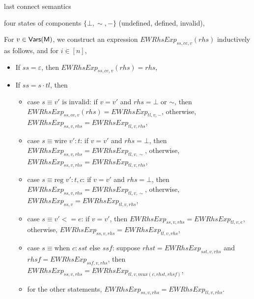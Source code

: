 {last connect semantics

four states of components $\{\bot, \sim, -\}$ (undefined, defined, invalid),

For $v \in \sf Vars(M)$, we construct an expression $EWRhsExp_{ss, ce, v}(rhs)$ inductively as follows,
and for $i \in [n]$,
\begin{itemize}
\item If $ss = \varepsilon$, then $EWRhsExp_{ss, ce, v}(rhs) = rhs$,
%
\item If $ss = s \cdot tl$, then
\begin{itemize}
\item case $s \equiv v' \mbox{ is invalid}$: if $v = v'$ and $rhs = \bot$ or $\sim$, then $EWRhsExp_{ss, ce, v}(rhs) = EWRhsExp_{tl, v, -}$, otherwise, $EWRhsExp_{ss, v, rhs} = EWRhsExp_{tl, v, rhs}$,
%
\item case $s \equiv \mbox{wire } v': t$: if $v = v'$ and $rhs = \bot$, then $EWRhsExp_{ss, v, rhs} = EWRhsExp_{tl, v, \sim}$, otherwise,  $EWRhsExp_{ss, v, rhs} = EWRhsExp_{tl, v, rhs}$,
%
\item case $s \equiv \mbox{reg } v': t, c$: if $v = v'$ and $rhs = \bot$, then $EWRhsExp_{ss, v, rhs} = EWRhsExp_{tl, v, \sim}$, otherwise, $EWRhsExp_{ss, v}  = EWRhsExp_{tl, v, rhs}$,
%
\item case $s \equiv v'<= e$: if $v = v'$, then $EWRhsExp_{ss, v, rhs} = EWRhsExp_{tl, v, e}$, otherwise,  $EWRhsExp_{ss, v, rhs} = EWRhsExp_{tl, v, rhs}$,
%
\item case $s \equiv \mbox{when } c: sst \mbox{ else } ssf$: suppose $rhst = EWRhsExp_{sst, v, rhs}$ and $rhsf = EWRhsExp_{ssf, v, rhs}$, then
$EWRhsExp_{ss, v, rhs} = EWRhsExp_{tl, v, mux(c, rhst, rhsf)}$,
%
%
\item for the other statements,  $EWRhsExp_{ss, v, rhs} = EWRhsExp_{tl, v, rhs}$.
%
%
%
\end{itemize}
\end{itemize}

}
